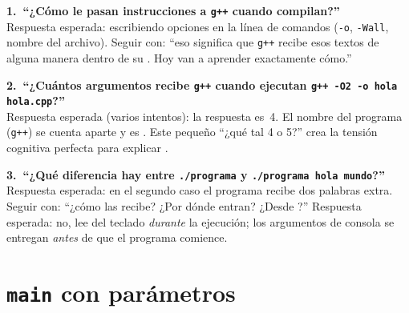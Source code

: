 \documentclass[12pt, oneside]{article}
\begin{document}
\begin{notaprofesor}

  \textbf{1.\ ``¿Cómo le pasan instrucciones a \texttt{g++} cuando
  compilan?''}\\
  Respuesta esperada: escribiendo opciones en la línea de comandos
  (\texttt{-o}, \texttt{-Wall}, nombre del archivo).  Seguir con:
  ``eso significa que \texttt{g++} recibe esos textos de alguna manera
  dentro de su .  Hoy van a aprender exactamente cómo.''

  \medskip
  \textbf{2.\ ``¿Cuántos argumentos recibe \texttt{g++} cuando
  ejecutan \texttt{g++ -O2 -o hola hola.cpp}?''}\\
  Respuesta esperada (varios intentos): la respuesta es~4.  El nombre
  del programa (\texttt{g++}) se cuenta aparte y es .
  Este pequeño ``¿qué tal 4 o 5?'' crea la tensión cognitiva perfecta
  para explicar .

  \medskip
  \textbf{3.\ ``¿Qué diferencia hay entre \texttt{./programa} y
  \texttt{./programa hola mundo}?''}\\
  Respuesta esperada: en el segundo caso el programa recibe dos
  palabras extra.  Seguir con: ``¿cómo las recibe?  ¿Por dónde entran?
  ¿Desde ?''  Respuesta esperada: no,  lee del
  teclado \textit{durante} la ejecución; los argumentos de consola
  se entregan \textit{antes} de que el programa comience.

\end{notaprofesor}

\section{\texttt{main} con parámetros}
\end{document}
